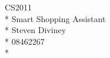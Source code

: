 \documentclass[a4paper,12pt]{article}
\begin{document}
\pagestyle{empty}
\begin{center}
{\large CS2011} \\*
Smart Shopping Assistant \\*
Steven Diviney \\*
08462267\\*
\end{center}
\end{document}
